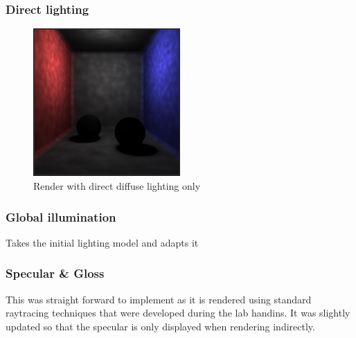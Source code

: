 \documentclass{article}
\begin{document}
\subsubsection{Direct lighting}
\begin{figure}[h]
\includegraphics[width=0.5\textwidth]{direct_diffuse}
\captionsetup{justification=centering,margin=0.5cm}
\caption{Render with direct diffuse lighting only}
\label{fig:direct_diffuse}
\end{figure}
\subsubsection{Global illumination}
Takes the initial lighting model and adapts it 

\subsubsection{Specular \& Gloss}
This was straight forward to implement as it is rendered using standard raytracing techniques that were developed during the lab handins. It was slightly updated so that the specular is only displayed when rendering indirectly. 
\end{document}
